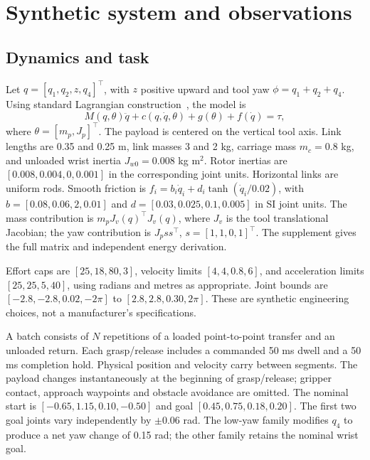 \documentclass[10pt,twocolumn]{article}
\begin{document}
\section{Synthetic system and observations}
\subsection{Dynamics and task}
Let $q=[q_1,q_2,z,q_4]^\top$, with $z$ positive upward and tool yaw $\phi=q_1+q_2+q_4$. Using standard Lagrangian construction~\cite{lynch2017}, the model is
\begin{equation}
 M(q,\theta)\ddot q+c(q,\dot q,\theta)+g(\theta)+f(\dot q)=\tau,
\end{equation}
where $\theta=[m_p,J_p]^\top$. The payload is centered on the vertical tool axis. Link lengths are 0.35 and 0.25 m, link masses 3 and 2 kg, carriage mass $m_c=0.8$ kg, and unloaded wrist inertia $J_{w0}=0.008$ kg m$^2$. Rotor inertias are $[0.008,0.004,0,0.001]$ in the corresponding joint units. Horizontal links are uniform rods. Smooth friction is $f_i=b_i\dot q_i+d_i\tanh(\dot q_i/0.02)$, with $b=[0.08,0.06,2,0.01]$ and $d=[0.03,0.025,0.1,0.005]$ in SI joint units. The mass contribution is $m_p J_v(q)^\top J_v(q)$, where $J_v$ is the tool translational Jacobian; the yaw contribution is $J_p ss^\top$, $s=[1,1,0,1]^\top$. The supplement gives the full matrix and independent energy derivation.

Effort caps are $[25,18,80,3]$, velocity limits $[4,4,0.8,6]$, and acceleration limits $[25,25,5,40]$, using radians and metres as appropriate. Joint bounds are $[-2.8,-2.8,0.02,-2\pi]$ to $[2.8,2.8,0.30,2\pi]$. These are synthetic engineering choices, not a manufacturer's specifications.

A batch consists of $N$ repetitions of a loaded point-to-point transfer and an unloaded return. Each grasp/release includes a commanded 50 ms dwell and a 50 ms completion hold. Physical position and velocity carry between segments. The payload changes instantaneously at the beginning of grasp/release; gripper contact, approach waypoints and obstacle avoidance are omitted. The nominal start is $[-0.65,1.15,0.10,-0.50]$ and goal $[0.45,0.75,0.18,0.20]$. The first two goal joints vary independently by $\pm0.06$ rad. The low-yaw family modifies $q_4$ to produce a net yaw change of 0.15 rad; the other family retains the nominal wrist goal.
\end{document}
